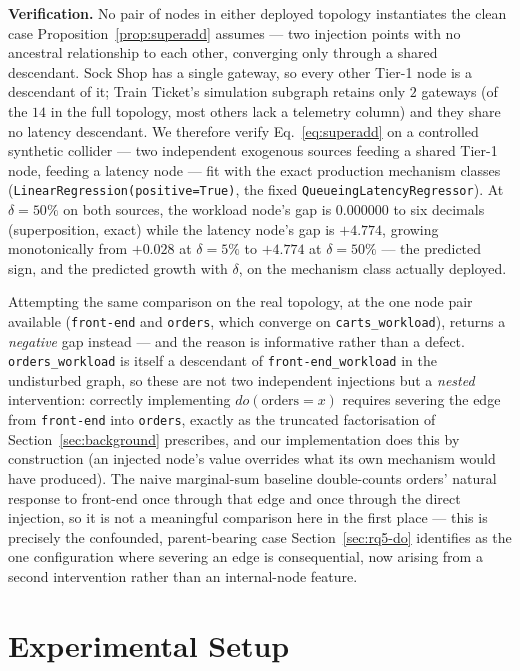 \documentclass[journal, 10pt]{IEEEtran}
\begin{document}
\textbf{Verification.} No pair of nodes in either deployed topology instantiates
the clean case Proposition~\ref{prop:superadd} assumes --- two injection points
with no ancestral relationship to each other, converging only through a shared
descendant. Sock Shop has a single gateway, so every other Tier-1 node is a
descendant of it; Train Ticket's simulation subgraph retains only $2$ gateways
(of the $14$ in the full topology, most others lack a telemetry column) and
they share no latency descendant. We therefore verify
Eq.~\eqref{eq:superadd} on a controlled synthetic collider --- two independent
exogenous sources feeding a shared Tier-1 node, feeding a latency node ---
fit with the exact production mechanism classes
(\texttt{LinearRegression(positive=True)}, the fixed
\texttt{QueueingLatencyRegressor}). At $\delta{=}50\%$ on both sources, the
workload node's gap is $0.000000$ to six decimals (superposition, exact) while
the latency node's gap is $+4.774$, growing monotonically from $+0.028$ at
$\delta{=}5\%$ to $+4.774$ at $\delta{=}50\%$ --- the predicted sign, and the
predicted growth with $\delta$, on the mechanism class actually deployed.

Attempting the same comparison on the real topology, at the one node pair
available (\texttt{front-end} and \texttt{orders}, which converge on
\texttt{carts\_workload}), returns a \emph{negative} gap instead --- and the
reason is informative rather than a defect. \texttt{orders\_workload} is
itself a descendant of \texttt{front-end\_workload} in the undisturbed graph,
so these are not two independent injections but a \emph{nested} intervention:
correctly implementing $do(\text{orders}{=}x)$ requires severing the edge from
\texttt{front-end} into \texttt{orders}, exactly as the truncated
factorisation of Section~\ref{sec:background} prescribes, and our
implementation does this by construction (an injected node's value overrides
what its own mechanism would have produced). The naive marginal-sum baseline
double-counts orders' natural response to front-end once through that edge and
once through the direct injection, so it is not a meaningful comparison here
in the first place --- this is precisely the confounded, parent-bearing case
Section~\ref{sec:rq5-do} identifies as the one configuration where severing an
edge is consequential, now arising from a second intervention rather than an
internal-node feature.


\section{Experimental Setup}
\label{sec:setup}
\end{document}
